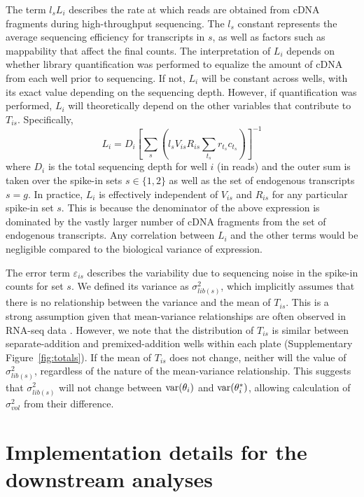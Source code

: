 \documentclass{article}
\begin{document}
The term $l_s L_i$ describes the rate at which reads are obtained from cDNA fragments during high-throughput sequencing.
The $l_s$ constant represents the average sequencing efficiency for transcripts in $s$, as well as factors such as mappability that affect the final counts.
The interpretation of $L_i$ depends on whether library quantification was performed to equalize the amount of cDNA from each well prior to sequencing.
If not, $L_i$ will be constant across wells, with its exact value depending on the sequencing depth.
However, if quantification was performed, $L_i$ will theoretically depend on the other variables that contribute to $T_{is}$.
Specifically,
\[
    L_i = D_i \left[ \sum_{s} \left( l_s V_{is} R_{is} \sum_{t_s} r_{t_s} c_{t_s} \right) \right]^{-1}
\]
where $D_i$ is the total sequencing depth for well $i$ (in reads) and the outer sum is taken over the spike-in sets $s\in \{1, 2\}$ as well as the set of endogenous transcripts $s=g$.
In practice, $L_i$ is effectively independent of $V_{is}$ and $R_{is}$ for any particular spike-in set $s$.
This is because the denominator of the above expression is dominated by the vastly larger number of cDNA fragments from the set of endogenous transcripts.
Any correlation between $L_i$ and the other terms would be negligible compared to the biological variance of expression.

The error term $\varepsilon_{is}$ describes the variability due to sequencing noise in the spike-in counts for set $s$.
We defined its variance as $\sigma^2_{lib(s)}$, which implicitly assumes that there is no relationship between the variance and the mean of $T_{is}$.
This is a strong assumption given that mean-variance relationships are often observed in RNA-seq data \cite{mccarthy2012differential,law2014voom}.
However, we note that the distribution of $T_{is}$ is similar between separate-addition and premixed-addition wells within each plate (Supplementary Figure~\ref{fig:totals}).
If the mean of $T_{is}$ does not change, neither will the value of $\sigma^2_{lib(s)}$, regardless of the nature of the mean-variance relationship. 
This suggests that $\sigma^2_{lib(s)}$ will not change between $\mbox{var}(\theta_i)$ and $\mbox{var}(\theta^*_i)$, allowing calculation of $\sigma^2_{vol}$ from their difference.

\section{Implementation details for the downstream analyses}
\end{document}
